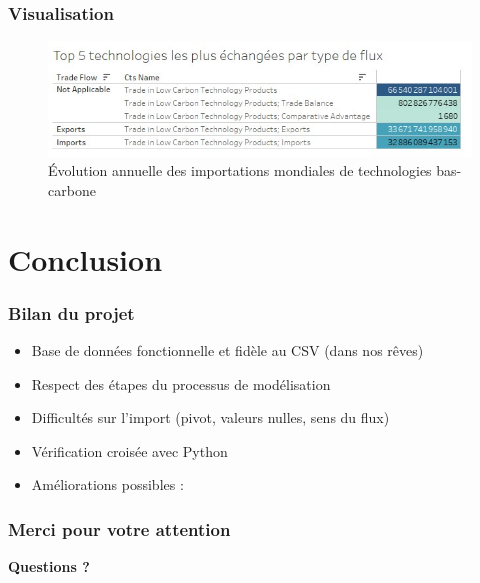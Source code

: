 \documentclass[11pt]{beamer}
\begin{document}
\begin{frame}
  \frametitle{Visualisation}
  \begin{figure}
    \centering
    \includegraphics[width=1\linewidth]{./Images/Top_5_technologies_les_plus_échangées_par_type_de_flux}
    \caption{Évolution annuelle des importations mondiales de technologies bas-carbone}
  \end{figure}
\end{frame}

\section{Conclusion}
\begin{frame}
  \frametitle{Bilan du projet}
  \begin{itemize}
    \item Base de données fonctionnelle et fidèle au CSV (dans nos rêves)
    \item Respect des étapes du processus de modélisation
    \item Difficultés sur l’import (pivot, valeurs nulles, sens du flux)
    \item Vérification croisée avec Python
    \item Améliorations possibles :
  \end{itemize}
\end{frame}

\begin{frame}
  \frametitle{Merci pour votre attention}
  \begin{center}
    \huge \textbf{Questions ?}
  \end{center}
\end{frame}
\end{document}
